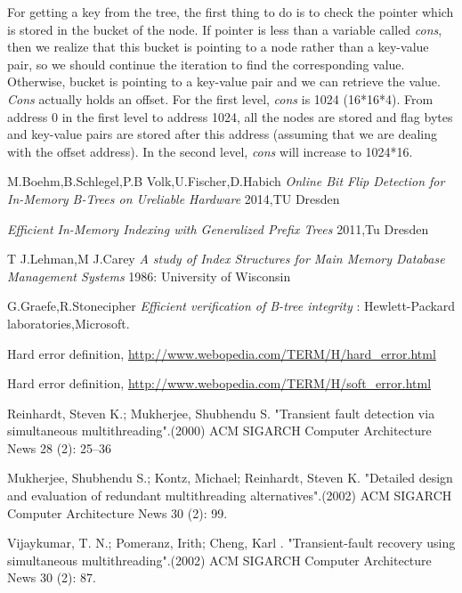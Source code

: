 \documentclass{report}
\begin{document}
For getting a key from the tree, the first thing to do is to check the pointer which is stored in the bucket of the node. If pointer is less than a variable called \textit{cons}, then we realize that this bucket is pointing to a node rather than a key-value pair, so we should continue the iteration to find the corresponding value. Otherwise, bucket is pointing to a key-value pair and we can retrieve the value. \textit{Cons} actually holds an offset. For the first level, \textit{cons} is 1024 (16*16*4). From address 0 in the first level to address 1024, all the nodes are stored and flag bytes and key-value pairs are stored after this address (assuming that we are dealing with the offset address). In the second level, \textit{cons} will increase to 1024*16.

      

\begin{thebibliography}{1}

 M.Boehm,B.Schlegel,P.B Volk,U.Fischer,D.Habich {\em Online Bit Flip Detection for In-Memory B-Trees on Ureliable Hardware} 2014,TU Dresden 

  {\em Efficient In-Memory Indexing with Generalized Prefix Trees} 2011,Tu Dresden

 T J.Lehman,M J.Carey {\em A study of Index Structures for Main Memory Database Management Systems} 1986: University of Wisconsin

 G.Graefe,R.Stonecipher {\em Efficient verification of B-tree integrity} : Hewlett-Packard laboratories,Microsoft.

Hard error definition, \url{http://www.webopedia.com/TERM/H/hard_error.html}

Hard error definition, \url{http://www.webopedia.com/TERM/H/soft_error.html}

Reinhardt, Steven K.; Mukherjee, Shubhendu S. "Transient fault detection via simultaneous multithreading".(2000) ACM SIGARCH Computer Architecture News 28 (2): 25–36

 Mukherjee, Shubhendu S.; Kontz, Michael; Reinhardt, Steven K. "Detailed design and evaluation of redundant multithreading alternatives".(2002) ACM SIGARCH Computer Architecture News 30 (2): 99.

 Vijaykumar, T. N.; Pomeranz, Irith; Cheng, Karl . "Transient-fault recovery using simultaneous multithreading".(2002) ACM SIGARCH Computer Architecture News 30 (2): 87.


\end{thebibliography}
\end{document}
